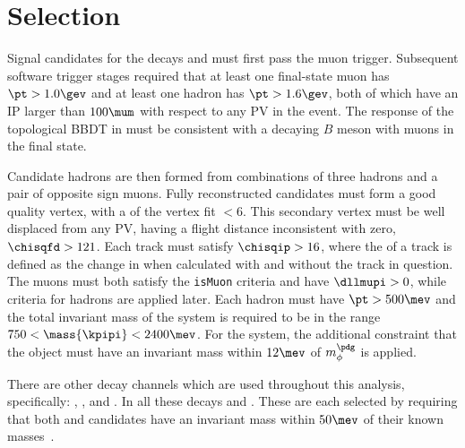 \section{Selection}

Signal candidates for the decays \btokpipimumu and \btophikmumu must first pass the \lone muon
trigger.
Subsequent software trigger stages required that at least one final-state muon has $\pt>1.0\gev$
and at least one hadron has $\pt>1.6\gev$, both of which have an IP larger than $100\mum$ with
respect to any PV in the event.
The response of the topological BBDT in \hlttwo must be consistent with a decaying $B$ meson
with muons in the final state.


Candidate \Bp hadrons are then formed from combinations of three hadrons and a pair of opposite
sign muons.
Fully reconstructed candidates must form a good quality vertex, with a \chisq of the vertex fit
$<6$.
This secondary vertex must be well displaced from any PV, having a flight distance inconsistent
with zero, $\chisqfd>121$.
Each track must satisfy $\chisqip>16$, where the \chisqip of a track is defined as the change in
\chisqip when calculated with and without the track in question.
The muons must both satisfy the {\tt isMuon} criteria and have $\dllmupi>0$,
while \pid criteria for hadrons are applied later.
Each hadron must have $\pt>500\mev$ and
the total invariant mass of the \kpipi system is required to be in the range
$750<\mass{\kpipi}<2400\mev$.
For the \phik system, the additional constraint that the \decay{\phi}{\kk} object must have an
invariant mass within $12\mev$ of $m_\phi^\pdg$ is applied.

There are other decay channels which are used throughout this analysis, specifically:
\btojpsikpipi, \btopsitwosk, and \btojpsiphik.
In all these decays \psitwostojpsipipi and \jpsitomumu.
These are each selected by requiring that both \jpsi and \psitwos candidates have an invariant
mass within $50\mev$ of their known masses~\cite{PDG2012}.



